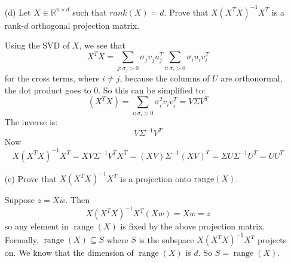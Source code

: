 \documentclass{article}
\begin{document}
\begin{itemize}
        \item [(d)] Let $X \in \mathbb{R}^{n \times d}$ such that $rank(X) = d$. Prove that $X(X^{T}X)^{-1}X^{T}$ is a rank-$d$ orthogonal projection matrix.
            \begin{answer}
                Using the SVD of $X$, we see that 
                    \begin{equation*}
                        X^{T}X = \sum_{j : \sigma_{j}  > 0} \sigma_{j} v_{j}u_{j}^{T}\sum_{i : \sigma_{i} > 0} \sigma_{i} u_{i}v_{i}^{T} 
                    \end{equation*}
                for the cross terms, where $i \neq j$, because the columns of $U$ are orthonormal, the dot product goes to $0$. So this can be simplified to:
                    \begin{equation*}
                        (X^{T}X) = \sum_{i : \sigma_{i}  > 0} \sigma_{i}^{2}v_{i}v_{i}^{T} = V\Sigma V^{T}
                    \end{equation*}
                The inverse is:
                    \begin{equation*}
                        V \Sigma^{-1} V^{T}
                    \end{equation*}
                Now
                    \begin{equation*}
                        X(X^{T}X)^{-1}X^{T} = XV\Sigma^{-1}V^{T}X^{T} = (XV)\Sigma^{-1}(XV)^{T} = \Sigma U \Sigma^{-1} U^{T} = UU^{T}
                    \end{equation*}
            \end{answer}

        \item [(e)] Prove that $X(X^{T}X)^{-1}X^{T}$ is a projection onto $\text{range}(X)$.
            \begin{answer}
                Suppose $z = Xw$. Then
                    \begin{equation*}
                        X(X^{T}X)^{-1}X^{T}(Xw) = Xw = z
                    \end{equation*}
                so any element in $\mathop{range}(X)$ is fixed by the above projection matrix. Formally, $\mathop{range}(X) \subseteq S$ where $S$ is the subspace $X(X^{T}X)^{-1}X^{T}$ projects on. We know that the dimension of $\mathop{range}(X)$ is $d$. So $S = \mathop{range}(X)$.
            \end{answer}


\end{itemize}
\end{document}
